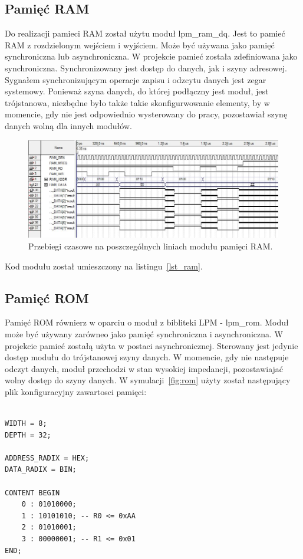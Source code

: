 \documentclass[a4paper,12pt]{report}
\begin{document}
\subsection{Pamięć RAM}
Do realizacji pamieci RAM został użytu moduł lpm\_ram\_dq. Jest to pamieć RAM z rozdzielonym wejściem i wyjściem. Może być używana jako pamięć synchroniczna lub asynchroniczna. W projekcie pamieć została zdefiniowana jako synchroniczna. Synchronizowany jest dostęp do danych, jak i szyny adresowej. Sygnałem synchronizującym operacje zapisu i odzcytu danych jest zegar systemowy. Ponieważ szyna danych, do której podłączny jest moduł, jest trójstanowa, niezbędne było także takie skonfigurwowanie elementy, by w momencie, gdy nie jest odpowiednio wysterowany do pracy, pozostawiał szynę danych wolną dla innych modułów.

\begin{figure}[h]
\centering
\includegraphics[width=15cm]{./pict/ram.jpg}
\caption{Przebiegi czasowe na poszczególnych liniach modułu pamięci RAM.}
\label{fig:ram}
\end{figure}

Kod modułu został umieszczony na listingu~\ref{lst_ram}.

\subsection{Pamięć ROM}
Pamięć ROM równierz w oparciu o moduł z bibliteki LPM - lpm\_rom. Moduł może być używany zarówneo  jako pamięć synchroniczna i asynchroniczna. W projekcie pamieć zostałą użyta w postaci asynchronicznej. Sterowany jest jedynie dostęp modułu do trójstanowej szyny danych. W momencie, gdy nie następuje odczyt danych, moduł przechodzi w stan wysokiej impedancji, pozostawiajać wolny dostęp do szyny danych.
W symulacji~\ref{fig:rom} użyty został następujący plik konfiguracyjny zawartosci pamięci:

\begin{lstlisting}[caption=Plik źródłowy dla symulacji~\ref{fig:rom},language=ahdl]

WIDTH = 8;
DEPTH = 32;

ADDRESS_RADIX = HEX;
DATA_RADIX = BIN;

CONTENT BEGIN
	0 : 01010000;
	1 : 10101010; -- R0 <= 0xAA
	2 : 01010001;
	3 : 00000001; -- R1 <= 0x01
END;
\end{lstlisting}
\lstset{
tabsize=4
}
\end{document}
